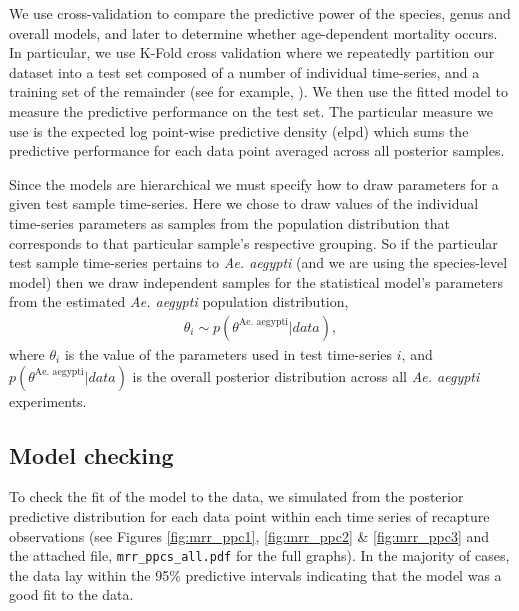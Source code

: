 \documentclass[12pt]{article}
\begin{document}
We use cross-validation to compare the predictive power of the species, genus and overall models, and later to determine whether age-dependent mortality occurs. In particular, we use K-Fold cross validation where we repeatedly partition our dataset into a test set composed of a number of individual time-series, and a training set of the remainder (see for example, \cite{marsland2015machine}). We then use the fitted model to measure the predictive performance on the test set. The particular measure we use is the expected log point-wise predictive density (elpd)\citep{vehtari2015efficient} which sums the predictive performance for each data point averaged across all posterior samples. 

Since the models are hierarchical we must specify how to draw parameters for a given test sample time-series. Here we chose to draw values of the individual time-series parameters as samples from the population distribution that corresponds to that particular sample's respective grouping. So if the particular test sample time-series pertains to \textit{Ae. aegypti} (and we are using the species-level model) then we draw independent samples for the statistical model's parameters from the estimated \textit{Ae. aegypti} population distribution,
%
\begin{align}
\theta_i \sim p(\theta^{\text{Ae. aegypti}}|data),
\end{align}
%
where $\theta_i$ is the value of the parameters used in test time-series $i$, and $p(\theta^{\text{Ae. aegypti}}|data)$ is the overall posterior distribution across all \textit{Ae. aegypti} experiments.

\subsection{Model checking}
To check the fit of the model to the data, we simulated from the posterior predictive distribution for each data point within each time series of recapture observations (see Figures \ref{fig:mrr_ppc1}, \ref{fig:mrr_ppc2} \&  \ref{fig:mrr_ppc3} and the attached file, \verb|mrr_ppcs_all.pdf| for the full graphs). In the majority of cases, the data lay within the 95\% predictive intervals indicating that the model was a good fit to the data. 
\end{document}
